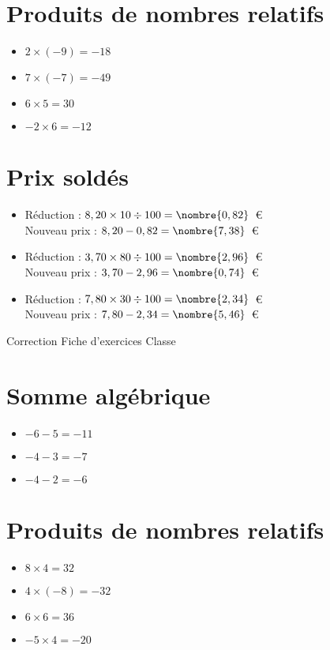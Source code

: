 \documentclass[a4paper,11pt,fleqn]{article}
\begin{document}
\section{Produits de nombres relatifs}
\begin{itemize}

  \item $2\times(-9)=-18$
  \item $7\times(-7)=-49$
  \item $6\times5=30$
  \item $-2\times6=-12$
\end{itemize}

\section{Prix soldés}
\begin{itemize}

  \item Réduction : $8,20\times10\div100=\nombre{0,82}$~€\\
  Nouveau prix : $8,20-0,82=\nombre{7,38}$~€
  \item Réduction : $3,70\times80\div100=\nombre{2,96}$~€\\
  Nouveau prix : $3,70-2,96=\nombre{0,74}$~€
  \item Réduction : $7,80\times30\div100=\nombre{2,34}$~€\\
  Nouveau prix : $7,80-2,34=\nombre{5,46}$~€
\end{itemize}
\newpage
\setcounter{exo}{0}
\setcounter{section}{0}
{Correction} \hfill {\huge Fiche d'exercices } \hfill {Classe}

\section{Somme algébrique}
\begin{itemize}

  \item $-6 -5=-11$
  \item $-4 -3=-7$
  \item $-4 -2=-6$
\end{itemize}

\section{Produits de nombres relatifs}
\begin{itemize}

  \item $8\times4=32$
  \item $4\times(-8)=-32$
  \item $6\times6=36$
  \item $-5\times4=-20$
\end{itemize}
\end{document}
